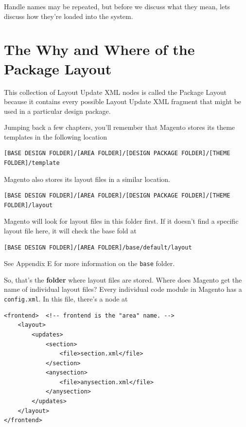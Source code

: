 \documentclass[oneside]{book}
\begin{document}
Handle names may be repeated, but before we discuss what they mean, lets discuss how they're loaded into the system.

\section{The Why and Where of the Package Layout}

This collection of Layout Update XML nodes is called the Package Layout because it contains every possible Layout Update XML fragment that might be used in a particular design package. 

Jumping back a few chapters, you'll remember that Magento stores its theme templates in the following location

\begin{lstlisting}
[BASE DESIGN FOLDER]/[AREA FOLDER]/[DESIGN PACKAGE FOLDER]/[THEME FOLDER]/template

\end{lstlisting}


Magento also stores its layout files in a similar location.

\begin{lstlisting}
[BASE DESIGN FOLDER]/[AREA FOLDER]/[DESIGN PACKAGE FOLDER]/[THEME FOLDER]/layout

\end{lstlisting}


Magento will look for layout files in this folder first.  If it doesn't find a specific layout file here, it will check the base fold at 

\begin{lstlisting}
[BASE DESIGN FOLDER]/[AREA FOLDER]/base/default/layout

\end{lstlisting}


See Appendix E for more information on the \footnotesize\texttt{base} \normalsize  folder.

So, that's the \textbf{folder} where layout files are stored.  Where does Magento get the name of individual layout files?  Every individual code module in Magento has a \footnotesize\texttt{config.xml}\normalsize.  In this file, there's a node at

\begin{lstlisting}
<frontend>  <!-- frontend is the "area" name. -->
    <layout>
        <updates>
            <section>
                <file>section.xml</file>
            </section>
            <anysection>
                <file>anysection.xml</file>
            </anysection>                
        </updates>
    </layout>
</frontend>

\end{lstlisting}
\end{document}
